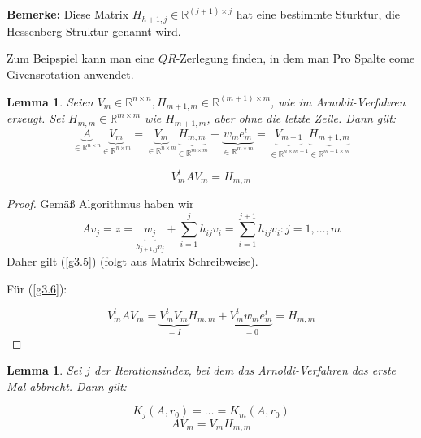 \documentclass{book}
\newtheorem{lemma}[algorithm]{Lemma}
\def\R{\mathbb{R}}
\begin{document}
            \underline{\textbf{Bemerke:}} Diese Matrix $H_{h+1,j}\in\R^{(j+1)\times j}$ hat eine bestimmte Sturktur,
            die Hessenberg-Struktur genannt wird.

            \begin{tcolorbox}[enhanced,breakable,
                title=Vorteile dieser Struktur]
                Zum Beipspiel kann man eine $QR$-Zerlegung finden, in dem man Pro Spalte eome Givensrotation anwendet.
            \end{tcolorbox}

            \begin{lemma}\label{l3.14}
                Seien $V_m\in\R^{n\times n}, H_{m+1,m}\in\R^{(m+1)\times m}$, wie im Arnoldi-Verfahren erzeugt. Sei $H_{m,m}\in\R^{m\times m}$ wie $H_{m+1,m}$, aber 
                ohne die letzte Zeile. Dann gilt:
                \begin{equation}\label{g3.5}
                    \underbrace{A}_{\in \R^{n\times n}}\underbrace{V_m}_{\in \R^{n\times m}}=\underbrace{V_m}_{\in \R^{n\times m}}\underbrace{H_{m,m}}_{\in \R^{m\times m}}+\underbrace{w_me_m^t}_{\in \R^{m\times m}}=\underbrace{V_{m+1}}_{\in \R^{n\times m+1}}\underbrace{H_{m+1,m}}_{\in \R^{m+1\times m}}
                \end{equation}
                
                \begin{equation}\label{g3.6}
                    V_m^tAV_m=H_{m,m}
                \end{equation}

            \end{lemma}

            \begin{proof}
                Gemäß Algorithmus haben wir 
                \[
                    Av_j=z=\underbrace{w_j}_{h_{j+1,j}v_j} + \sum_{i=1}^{j}h_{ij} v_i = \sum_{i=1}^{j+1} h_{ij} v_i : j=1,\dots, m    
                \]
                Daher gilt (\ref{g3.5}) (folgt aus Matrix Schreibweise).

                Für (\ref{g3.6}):

                \[
                    V_m^t A V_m = \underbrace{V^t_m V_m}_{=I} H_{m,m}+ \underbrace{V_m^t w_m e_m^t}_{=0} = H_{m,m} 
                \]
            \end{proof}

            \begin{lemma}\label{l3.15}
                Sei $j$ der Iterationsindex, bei dem das Arnoldi-Verfahren das erste Mal abbricht. Dann gilt:

                \[
                  K_j(A,r_0)=\dots = K_m(A,r_0)  
                \]
                \[
                  AV_m=V_m H_{m,m}  
                \]
            \end{lemma}
\end{document}

